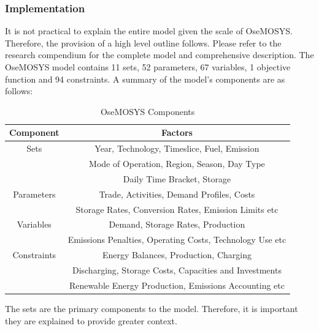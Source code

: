 \documentclass[12pt]{article}
\begin{document}
\subsubsection{Implementation}\label{OIMPLEM}
It is not practical to explain the entire model given the scale of OseMOSYS. 
Therefore, the provision of a high level outline follows. Please refer to the research compendium for the complete model and comprehensive description.
The OseMOSYS model contains 11 sets, 52 parameters, 67 variables, 1 objective function and 94 constraints. 
A summary of the model's components are as follows:
\begin{table}[H]
	\centering
	\begin{tabular}{||c | c||} 
	 \hline
	 Component & Factors \\ [0.5ex] 
	 \hline\hline
	 Sets & Year, Technology, Timeslice, Fuel, Emission\\ 
	 & Mode of Operation, Region, Season, Day Type \\
	 & Daily Time Bracket, Storage \\
	 \hline  
	 Parameters & Trade, Activities, Demand Profiles, Costs \\
	 & Storage Rates, Conversion Rates, Emission Limits etc \\
	 \hline
	 Variables & Demand, Storage Rates, Production \\
	 & Emissions Penalties, Operating Costs, Technology Use etc\\
	 \hline
	 Constraints &  Energy Balances, Production, Charging\\
	 & Discharging, Storage Costs, Capacities and Investments\\ 
	 & Renewable Energy Production, Emissions Accounting etc \\[1ex] 
	 \hline
	\end{tabular}
	\caption{OseMOSYS Components}
	\label{table:1}
	\end{table}
The sets are the primary components to the model. Therefore, it is important they are explained to provide greater context.
\end{document}
